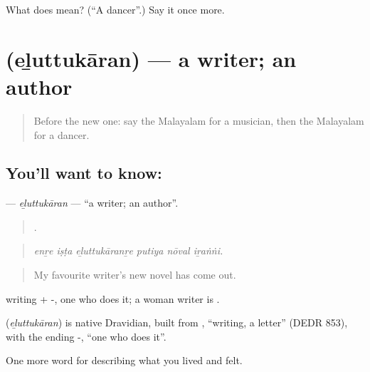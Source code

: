 \begin{tcolorbox}[breakable,colback=teal!4,colframe=teal!35!black,title={Before you move on}]
What does  mean? (\textquotedblleft{}A dancer\textquotedblright{}.) Say it once more.
\end{tcolorbox}
\section[\texorpdfstring{\ml{എഴുത്തുകാരൻ} (eḻuttukāran)}{എഴുത്തുകാരൻ (eḻuttukāran)}]{ (eḻuttukāran) — a writer; an author}

\label{lesson:ML-C565-eluttukaran}



\begin{quote}
Before the new one: say the Malayalam for a musician, then the Malayalam for a dancer.
\end{quote}

\subsection*{You'll want to know: }
\textbf{} — \emph{eḻuttukāran} — \textquotedblleft{}a writer; an author\textquotedblright{}.

\begin{quote}
     .
\end{quote}

\begin{quote}
\emph{enṟe iṣṭa eḻuttukāranṟe putiya nōval iṟaṅṅi.}
\end{quote}

\begin{quote}
My favourite writer's new novel has come out.
\end{quote}

 writing + -, one who does it; a woman writer is .

\begin{cousinweb}
\textbf{} (\emph{eḻuttukāran}) is native Dravidian, built from , \textquotedblleft{}writing, a letter\textquotedblright{} (DEDR 853), with the ending -, \textquotedblleft{}one who does it\textquotedblright{}.
\end{cousinweb}

\begin{grammarlens}[title={What you've built}]
One more word for describing what you lived and felt.
\end{grammarlens}

